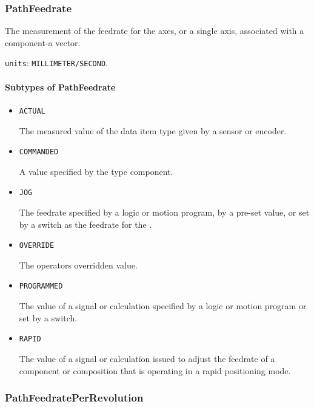 \subsubsection{PathFeedrate}
\label{sec:PathFeedrate}



The measurement of the feedrate for the axes, or a single axis, associated with a  component-a vector.


\texttt{units}: \texttt{MILLIMETER/SECOND}.

\paragraph{Subtypes of PathFeedrate}\mbox{}
\label{sec:Subtypes of PathFeedrate}

\begin{itemize}

\item \texttt{ACTUAL}


The measured value of the data item type given by a sensor or encoder.

\item \texttt{COMMANDED}


A value specified by the  type component.

\item \texttt{JOG}


The feedrate specified by a logic or motion program, by a pre-set value, or set by a switch as the feedrate for the . 

\item \texttt{OVERRIDE}


The operators overridden value.

\item \texttt{PROGRAMMED}


The value of a signal or calculation specified by a logic or motion program or set by a switch.

\item \texttt{RAPID}


The value of a signal or calculation issued to adjust the feedrate of a component or composition that is operating in a rapid positioning mode.


\end{itemize}









\subsubsection{PathFeedratePerRevolution}
\label{sec:PathFeedratePerRevolution}



